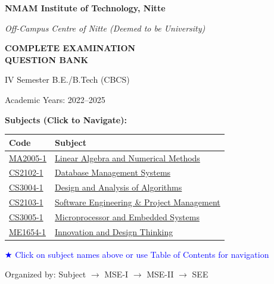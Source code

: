\documentclass[11pt,a4paper]{article}
\begin{document}
\begin{titlepage}
\centering
\vspace*{2cm}
{\Huge\bfseries NMAM Institute of Technology, Nitte\par}
\vspace{0.5cm}
{\Large\itshape Off-Campus Centre of Nitte (Deemed to be University)\par}
\vspace{2cm}
{\Huge\bfseries COMPLETE EXAMINATION\\QUESTION BANK\par}
\vspace{1cm}
{\Large IV Semester B.E./B.Tech (CBCS)\par}
\vspace{1cm}
{\Large Academic Years: 2022--2025\par}
\vspace{2cm}
{\Large\bfseries Subjects (Click to Navigate):\par}
\vspace{0.5cm}
\begin{tabular}{|l|l|}
\hline
\textbf{Code} & \textbf{Subject} \\
\hline
\hyperlink{part.1}{MA2005-1} & \hyperlink{part.1}{Linear Algebra and Numerical Methods} \\
\hyperlink{part.2}{CS2102-1} & \hyperlink{part.2}{Database Management Systems} \\
\hyperlink{part.3}{CS3004-1} & \hyperlink{part.3}{Design and Analysis of Algorithms} \\
\hyperlink{part.4}{CS2103-1} & \hyperlink{part.4}{Software Engineering \& Project Management} \\
\hyperlink{part.5}{CS3005-1} & \hyperlink{part.5}{Microprocessor and Embedded Systems} \\
\hyperlink{part.6}{ME1654-1} & \hyperlink{part.6}{Innovation and Design Thinking} \\
\hline
\end{tabular}
\vspace{1cm}
{\large \textcolor{blue}{$\bigstar$ Click on subject names above or use Table of Contents for navigation}\par}
\vfill
{\large Organized by: Subject $\to$ MSE-I $\to$ MSE-II $\to$ SEE\par}
\end{titlepage}

\tableofcontents
\newpage

\end{document}
